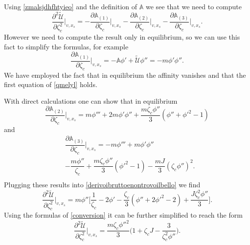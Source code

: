 \documentclass[useAMS,usenatbib,prd,twocolumn,nofootinbib]{revtex4-1}
\begin{document}
Using \eqref{zmalsjdhfhtyieo} and the definition of $\mathbb{A}$ we see that we need to compute
\begin{equation}\label{derivoibruttoenontrovoilbello}
\dfrac{\partial^2 \tilde{\mathcal{U}}}{\partial \zeta_c^2}  \bigg|_{v,x_s} =- \dfrac{\partial \mathbb{A}_{(1)}}{\partial \zeta_c} \bigg|_{v,x_s} - \dfrac{\partial \mathbb{A}_{(2)}}{\partial \zeta_c} \bigg|_{v,x_s} - \dfrac{\partial \mathbb{A}_{(3)}}{\partial \zeta_c} \bigg|_{v,x_s}.
\end{equation}
However we need to compute the result only in equilibrium, so we can use this fact to simplify the formulas, for example
\begin{equation}
\dfrac{\partial \mathbb{A}_{(1)}}{\partial \zeta_c} \bigg|_{v,x_s} = -\mathbb{A} \phi' + \tilde{\mathcal{U}} \phi'' = -m \phi' \phi''. 
\end{equation}
We have employed the fact that in equilibrium the affinity vanishes and that the first equation of \eqref{qmelyl} holds. 

With direct calculations one can show that in equilibrium
\begin{equation}
\dfrac{\partial \mathbb{A}_{(2)}}{\partial \zeta_c} \bigg|_{v,x_s} = m \phi''' +2m \phi' \phi'' + \dfrac{m \zeta_c \phi''}{3} (\phi'' + {\phi'}^2 - 1)
\end{equation}
and
\begin{equation}
\begin{split}
& \dfrac{\partial \mathbb{A}_{(3)}}{\partial \zeta_c} \bigg|_{v,x_s} = -m \phi'''+  m \phi' \phi''  \\
&  - \dfrac{m\phi''}{\zeta_c} +   \dfrac{m \zeta_c \phi''}{3} ( {\phi'}^2 - 1) -  \dfrac{mJ}{3} (\zeta_c \phi'')^2 . \\
\end{split}
\end{equation}
Plugging these results into \eqref{derivoibruttoenontrovoilbello} we find
\begin{equation}
\dfrac{\partial^2 \tilde{\mathcal{U}}}{\partial \zeta_c^2}  \bigg|_{v,x_s} =
 m \phi'' \bigg[\dfrac{1}{\zeta_c}  -2 \phi'     -\dfrac{ \zeta_c }{3} (\phi'' + 2{\phi'}^2 - 2) +   \dfrac{J \zeta_c^2 \phi''}{3} \bigg] .
\end{equation}
Using the formulas of \eqref{conversion} it can be further simplified to reach the form
\begin{equation}
\dfrac{\partial^2 \tilde{\mathcal{U}}}{\partial \zeta_c^2}  \bigg|_{v,x_s} = \dfrac{m \zeta_c {\phi''}^2}{3} \bigg( 1+ \zeta_c J - \dfrac{3}{\zeta_c^2 \phi''} \bigg).
\end{equation} 
\end{document}
